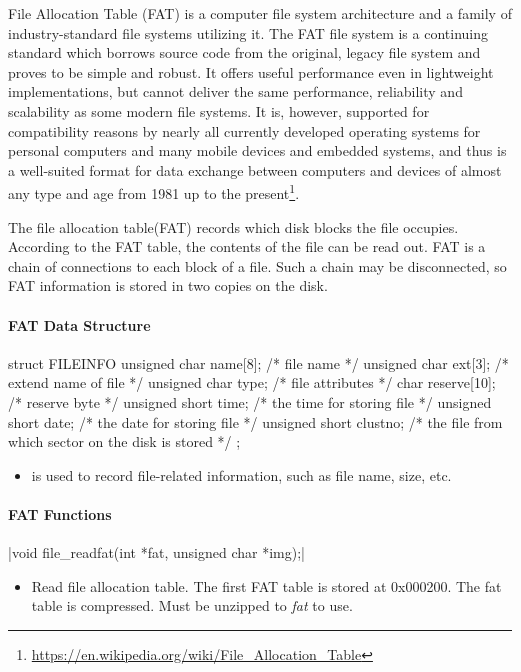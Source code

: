 \documentclass{swfcthesis}
\begin{document}
File Allocation Table (FAT) is a computer file system architecture and a family of
industry-standard file systems utilizing it. The FAT file system is a continuing standard
which borrows source code from the original, legacy file system and proves to be simple
and robust. It offers useful performance even in lightweight implementations, but cannot
deliver the same performance, reliability and scalability as some modern file systems. It
is, however, supported for compatibility reasons by nearly all currently developed
operating systems for personal computers and many mobile devices and embedded systems, and
thus is a well-suited format for data exchange between computers and devices of almost any
type and age from 1981 up to the
present\footnote{\url{https://en.wikipedia.org/wiki/File_Allocation_Table}}.


The file allocation table(FAT) records which disk blocks the file occupies. According to
the FAT table, the contents of the file can be read out. FAT is a chain of connections to
each block of a file. Such a chain may be disconnected, so FAT information is stored in
two copies on the disk.
  
\paragraph{FAT Data Structure}

\begin{codeblock}[1]
\begin{ccode}
struct FILEINFO
{ 
  unsigned char name[8];   /* file name */
  unsigned char ext[3];    /* extend name of file */
  unsigned char type;      /* file attributes */
  char reserve[10];        /* reserve byte */
  unsigned short time;     /* the time for storing file */
  unsigned short date;     /* the date for storing file */
  unsigned short  clustno; /* the file from which sector on the disk is stored */
};
\end{ccode}
\end{codeblock}
\begin{itemize}
\item is used to record file-related information, such as file name, size, etc.
\end{itemize}

\paragraph{FAT Functions}

\csingle|void file_readfat(int *fat, unsigned char *img);|
\begin{itemize}
\item Read file allocation table. The first FAT table is stored at 0x000200. The fat table
  is compressed. Must be unzipped to \emph{fat} to use. 
  
\end{itemize}
\end{document}
